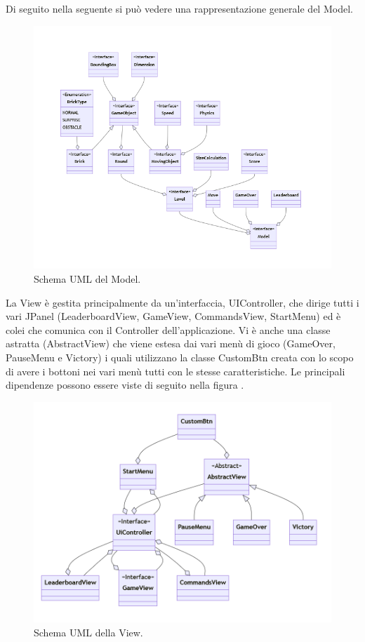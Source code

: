 \documentclass[a4paper,12pt]{report}
\begin{document}
Di seguito nella  seguente si può vedere una rappresentazione generale del Model.
\begin{figure}[H]
    \centering{}
    \includegraphics[scale=0.7]{images/Model.png}
    \caption{Schema UML del Model.}
    \label{images:Model}
\end{figure}
La View è gestita principalmente da un'interfaccia, UIController, che dirige tutti i vari JPanel (LeaderboardView, GameView, CommandsView, StartMenu) ed è colei
che comunica con il Controller dell'applicazione.
Vi è anche una classe astratta (AbstractView) che viene estesa dai vari menù di gioco (GameOver, PauseMenu e Victory) i quali utilizzano la classe CustomBtn
creata con lo scopo di avere i bottoni nei vari menù tutti con le stesse caratteristiche. Le principali dipendenze possono essere viste di seguito nella figura .
\begin{figure}[H]
    \centering{}
    \includegraphics[scale=0.5]{images/View.png}
    \caption{Schema UML della View.}
    \label{images:View}
\end{figure}
\end{document}

